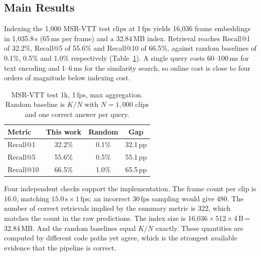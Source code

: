 \documentclass[journal]{IEEEtran}
\begin{document}
\subsection{Main Results}
Indexing the 1{,}000 MSR-VTT test clips at 1\,fps yields 16{,}036 frame embeddings in
1{,}035.8\,s (65\,ms per frame) and a 32.84\,MB index. Retrieval reaches Recall@1 of 32.2\%,
Recall@5 of 55.6\% and Recall@10 of 66.5\%, against random baselines of 0.1\%, 0.5\% and 1.0\%
respectively (Table~\ref{tab:main}). A single query costs 60--100\,ms for text encoding and
1--6\,ms for the similarity search, so online cost is close to four orders of magnitude below
indexing cost.

\begin{table}[t]
\centering
\caption{MSR-VTT test 1k, 1\,fps, max aggregation. Random baseline is $K/N$ with $N=1{,}000$
clips and one correct answer per query.}
\label{tab:main}
\begin{tabular*}{\columnwidth}{@{\extracolsep{\fill}}lccc@{}}
\toprule
Metric & This work & Random & Gap \\
\midrule
Recall@1  & 32.2\% & 0.1\% & 32.1\,pp \\
Recall@5  & 55.6\% & 0.5\% & 55.1\,pp \\
Recall@10 & 66.5\% & 1.0\% & 65.5\,pp \\
\bottomrule
\end{tabular*}
\end{table}

Four independent checks support the implementation. The frame count per clip is 16.0, matching
$15.0\,\text{s}\times1\,\text{fps}$; an incorrect 30\,fps sampling would give 480. The number of
correct retrievals implied by the summary metric is 322, which matches the count in the raw
predictions. The index size is 16{,}036\,$\times$\,512\,$\times$\,4\,B\,=\,32.84\,MB. And the
random baselines equal $K/N$ exactly. These quantities are computed by different code paths yet
agree, which is the strongest available evidence that the pipeline is correct.
\end{document}
